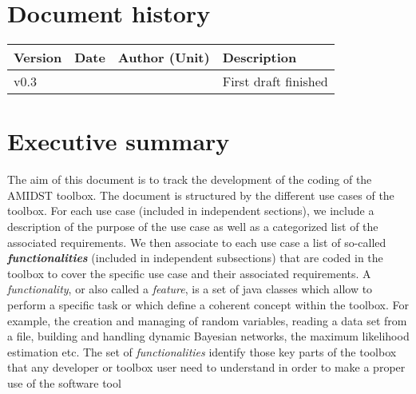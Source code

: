 \documentclass[11pt, oneside]{article}   	%
\begin{document}
%

%
%



\tableofcontents

\newpage


\section*{Document history}

\begin{table}[htbp]
  \centering
  \begin{tabularx}{\linewidth}{|p{17mm}|p{17mm}|X|X|}\hline
    {\bf Version} & {\bf Date} & {\bf Author (Unit)} & {\bf Description} \\ \hline \hline
    v0.3 &  &  & First draft finished  \\ 
\hline
  \end{tabularx}
\end{table}

\newpage



\section*{Executive summary}
\label{sec:summary}

The aim of this document is to track the development of the coding of the AMIDST toolbox. The document is structured by the different use cases of the toolbox.  For each use case (included in independent sections),  we include a description of the purpose of the use case as well as a categorized list of the associated requirements. We then associate to each use case a list of so-called \textit{\textbf{functionalities}} (included in independent subsections) that are coded in the toolbox to cover the specific use case and their associated requirements. A \textit{functionality}, or also called a \textit{feature}, is a set of java classes which allow to perform a specific task or which define a coherent concept within the toolbox. For example, the creation and managing of random variables, reading a data set from a file, building and handling dynamic Bayesian networks, the maximum likelihood estimation etc. The set of \textit{functionalities} identify those key parts of the toolbox that any developer or toolbox user need to understand in order to make a proper use of the software tool
\end{document}
